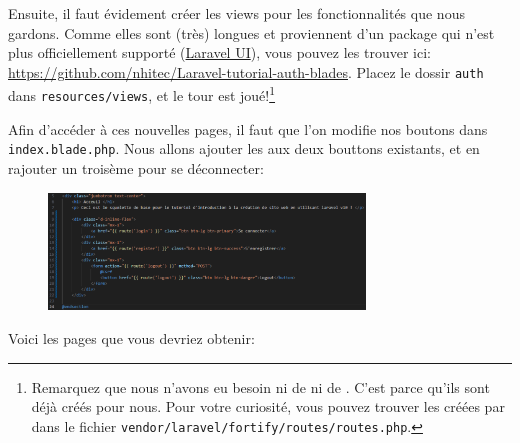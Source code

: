 Ensuite, il faut évidement créer les views pour les fonctionnalités que nous gardons. Comme elles sont (très) longues et proviennent d'un package qui n'est plus officiellement supporté (\href{https://github.com/laravel/ui}{Laravel UI}), vous pouvez les trouver ici: \url{https://github.com/nhitec/Laravel-tutorial-auth-blades}. Placez le dossir \verb|auth| dans \verb|resources/views|, et le tour est joué!\footnote{Remarquez que nous n'avons eu besoin ni de \controllers{} ni de \routes{}. C'est parce qu'ils sont déjà créés pour nous. Pour votre curiosité, vous pouvez trouver les \routes{} créées par \fortify{} dans le fichier \verb|vendor/laravel/fortify/routes/routes.php|.}

Afin d'accéder à ces nouvelles pages, il faut que l'on modifie nos boutons dans \verb|index.blade.php|. Nous allons ajouter les \routes{} aux deux bouttons existants, et en rajouter un troisème pour se déconnecter:

\begin{figure}[!h]
    \centering
    \includegraphics[width=0.75\textwidth]{figures-C1/index_auth.pdf}
\end{figure}

\newpage

Voici les pages que vous devriez obtenir:

